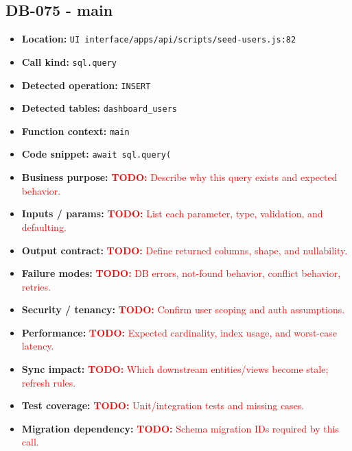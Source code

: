 \documentclass[11pt]{article}
\newcommand{\todoitem}[1]{\textcolor{red}{\textbf{TODO:} #1}}
\begin{document}
\subsection{DB-075 - main}
\begin{itemize}[leftmargin=1.5em]
\item \textbf{Location:} \texttt{UI interface/apps/api/scripts/seed-users.js:82}
\item \textbf{Call kind:} \texttt{sql.query}
\item \textbf{Detected operation:} \texttt{INSERT}
\item \textbf{Detected tables:} \texttt{dashboard\_users}
\item \textbf{Function context:} \texttt{main}
\item \textbf{Code snippet:} \texttt{await sql.query(}
\item \textbf{Business purpose:} \todoitem{Describe why this query exists and expected behavior.}
\item \textbf{Inputs / params:} \todoitem{List each parameter, type, validation, and defaulting.}
\item \textbf{Output contract:} \todoitem{Define returned columns, shape, and nullability.}
\item \textbf{Failure modes:} \todoitem{DB errors, not-found behavior, conflict behavior, retries.}
\item \textbf{Security / tenancy:} \todoitem{Confirm user scoping and auth assumptions.}
\item \textbf{Performance:} \todoitem{Expected cardinality, index usage, and worst-case latency.}
\item \textbf{Sync impact:} \todoitem{Which downstream entities/views become stale; refresh rules.}
\item \textbf{Test coverage:} \todoitem{Unit/integration tests and missing cases.}
\item \textbf{Migration dependency:} \todoitem{Schema migration IDs required by this call.}
\end{itemize}
\end{document}
